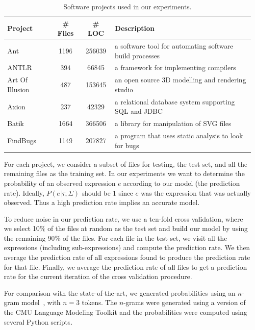 \documentclass{article} %
\begin{document}
\setlength{\textfloatsep}{10pt}
\begin{table}[t]
\centering
\begin{tabular}{|l|c|c|l|}
\hline
\textbf{Project} & \textbf{\# Files} & \textbf{\# LOC} & \textbf{Description} \\
\hline
Ant & 1196 & 256039 & a software tool for automating software build processes \\
ANTLR & 394 & 66845 & a framework for implementing compilers \\
Art Of Illusion & 487 & 153645 & an open source 3D modelling and rendering studio \\
Axion & 237 & 42329 & a relational database system supporting SQL and JDBC \\
Batik & 1664 & 366506 & a library for manipulation of SVG files \\
FindBugs & 1149 & 207827 & a program that uses static analysis to look for bugs \\
\hline
\end{tabular}
\caption{Software projects used in our experiments.}
\label{tab:projects}
\end{table}
For each project, we consider a subset of files for testing, the test set, and all the remaining files as the training set.
In our experiments we want to determine the probability of an observed expression $e$ according to our model (the prediction rate). Ideally, $P(e| \tau, \Sigma)$ should be 1 since $e$ was the expression that was actually observed. Thus a high prediction rate implies an accurate model.

To reduce noise in our prediction rate, we use a ten-fold cross validation, where we select 10\% of the files at random as the test set and build our model by using the remaining 90\% of the files. For each file in the test set, we visit all the expressions (including sub-expressions) and compute the prediction rate. We then average the prediction rate of all expressions found to produce the prediction rate for that file. Finally, we average the prediction rate of all files to get a prediction rate for the current iteration of the cross validation procedure.

For comparison with the state-of-the-art, we generated probabilities using an $n$-gram model~\cite{Hindle:2012:NS:2337223.2337322}, with $n = 3$ tokens. The $n$-grams were generated using a version of the CMU Language Modeling Toolkit and the probabilities were computed using several Python scripts.
\end{document}
